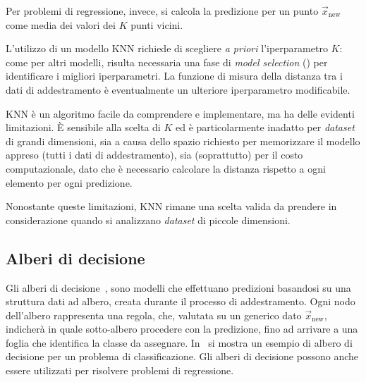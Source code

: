 Per problemi di regressione, invece, si calcola la predizione per un punto $\Vec{x}_\text{new}$ come media dei valori dei $K$ punti vicini.

L'utilizzo di un modello KNN richiede di scegliere \emph{a priori} l'iperparametro $K$:
come per altri modelli, risulta necessaria una fase di \emph{model selection} () per identificare i migliori iperparametri.
La funzione di misura della distanza tra i dati di addestramento è eventualmente un ulteriore iperparametro modificabile.

KNN è un algoritmo facile da comprendere e implementare, ma ha delle evidenti limitazioni. 
\`E sensibile alla scelta di $K$ ed è particolarmente inadatto per \emph{dataset} di grandi dimensioni, sia a causa dello spazio richiesto per memorizzare il modello appreso (tutti i dati di addestramento), sia (soprattutto) per il costo computazionale, dato che è necessario calcolare la distanza rispetto a ogni elemento per ogni predizione.

Nonostante queste limitazioni, KNN rimane una scelta valida da prendere in considerazione quando si analizzano \emph{dataset} di piccole dimensioni.

\subsection{Alberi di decisione}
Gli alberi di decisione~\cite{decision_tree}, sono modelli che effettuano predizioni basandosi su una struttura dati ad albero, creata durante il processo di addestramento. 
Ogni nodo dell'albero rappresenta una regola, che, valutata su un generico dato $\Vec{x}_\text{new}$, indicherà in quale sotto-albero procedere con la predizione, fino ad arrivare a una foglia che identifica la classe da assegnare. 
In~ si mostra un esempio di albero di decisione per un problema di classificazione.
Gli alberi di decisione possono anche essere utilizzati per risolvere problemi di regressione.

